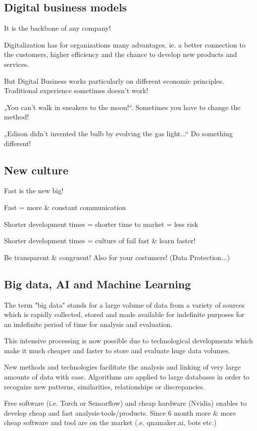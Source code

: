 \subsection{Digital business models}
\begin{compactitem}
	\item It is the backbone of any company!
	\item Digitalization has for organizations many advantages, ie. a better connection to the customers, higher efficiency and the chance to develop new products and services.
	\item But Digital Business works particularly on different economic principles.	Traditional experience sometimes doesn’t work!
	\item „You can’t walk in sneakers to the moon!“. Sometimes you have to change the method!
	\item „Edison didn’t invented the bulb by evolving the gas light...“ Do something different!
\end{compactitem}

\subsection{New culture}
\begin{compactitem}
	\item Fast is the new big!
	\item Fast = more  \& constant communication
	\item Shorter development times = shorter time to market = less risk
	\item Shorter development times = culture of fail fast \& learn faster!
	\item Be transparent \& congruent! Also for your costumers! (Data Protection...)
\end{compactitem}

\subsection{Big data, AI and Machine Learning}
\begin{compactitem}
	\item The term "big data" stands for a large volume of data from a variety of sources which is rapidly collected, stored and made available for indefinite purposes for an indefinite period of time for analysis and evaluation.
	\item This intensive processing is now possible due to technological developments which make it much cheaper and faster to store and evaluate huge data volumes.
	\item New methods and technologies facilitate the analysis and linking of very large amounts of data with ease. Algorithms are applied to large databases in order to recognize new patterns, similarities, relationships or discrepancies.
	\item Free software (i.e. Torch or Sensorflow) and cheap hardware (Nvidia) enables to develop cheap and fast analysis-tools/products. Since 6 month more \& more cheap software and tool are on the market (.e. qnamaker.ai, bots etc.)
\end{compactitem}

